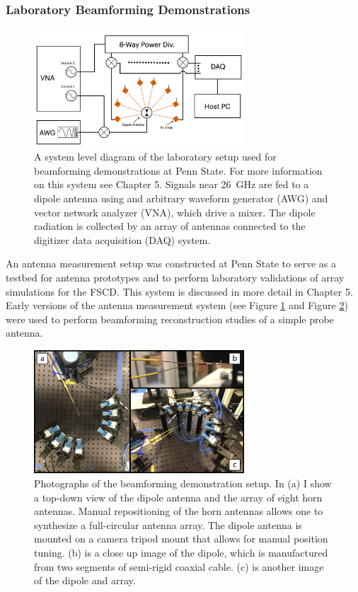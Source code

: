\subsubsection*{Laboratory Beamforming Demonstrations}

\begin{figure}[htbp]
    \centering
    \includegraphics*[width=0.7\textwidth]{figs/Chapter-4/230725_beamforming_setup_diagram.png}
    \caption{\label{fig:chap4-beamforming-demo-system}A system level diagram of the laboratory setup used for beamforming demonstrations at Penn State. For more information on this system see Chapter 5. Signals near 26~GHz are fed to a dipole antenna using and arbitrary waveform generator (AWG) and vector network analyzer (VNA), which drive a mixer. The dipole radiation is collected by an array of antennas connected to the digitizer data acquisition (DAQ) system.}
\end{figure}

An antenna measurement setup was constructed at Penn State to serve as a testbed for antenna prototypes and to perform laboratory validations of array simulations for the FSCD. This system is discussed in more detail in Chapter 5. Early versions of the antenna measurement system (see Figure \ref{fig:chap4-beamforming-demo-system} and Figure \ref{fig:chap4-beamforming-demo-photos}) were used to perform beamforming reconstruction studies of a simple probe antenna.

\begin{figure}
    \centering
    \includegraphics*[width=0.7\textwidth]{figs/Chapter-4/230725_beamforming_demo_image.png}
    \caption{\label{fig:chap4-beamforming-demo-photos}Photographs of the beamforming demonstration setup. In (a) I show a top-down view of the dipole antenna and the array of eight horn antennas. Manual repositioning of the horn antennas allows one to synthesize a full-circular antenna array. The dipole antenna is mounted on a camera tripod mount that allows for manual position tuning. (b) is a close up image of the dipole, which is manufactured from two segments of semi-rigid coaxial cable. (c) is another image of the dipole and array.}
\end{figure}

